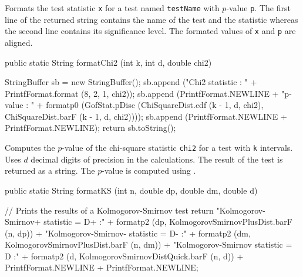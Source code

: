 \begin{tabb}   Formats the test statistic \texttt{x} for a test named \texttt{testName}
   with $p$-value \texttt{p}.  The first line of the returned string contains
   the name of the test and the statistic whereas the second line contains
   its significance level.  The formated values of \texttt{x} and \texttt{p} are
   aligned.
\end{tabb}
\begin{htmlonly}
\end{htmlonly}
\begin{code}

   public static String formatChi2 (int k, int d, double chi2)\begin{hide} {
      StringBuffer sb = new StringBuffer();
      sb.append ("Chi2 statistic                        : " +
                  PrintfFormat.format (8, 2, 1, chi2));
      sb.append (PrintfFormat.NEWLINE +
                 "p-value                               : " +
                 formatp0 (GofStat.pDisc
                          (ChiSquareDist.cdf (k - 1, d, chi2),
                           ChiSquareDist.barF (k - 1, d, chi2))));
      sb.append (PrintfFormat.NEWLINE + PrintfFormat.NEWLINE);
      return sb.toString();
   }\end{hide}
\end{code}
\begin{tabb}   Computes the $p$-value of the chi-square statistic
  \texttt{chi2} for a test with \texttt{k} intervals.  Uses $d$ decimal digits
  of precision in the calculations. The result of the
  test is returned as a string.  The $p$-value is computed using
  .
\end{tabb}
\begin{htmlonly}
\end{htmlonly}
\begin{code}

   public static String formatKS (int n, double dp,
                                  double dm, double d)\begin{hide} {
      // Prints the results of a Kolmogorov-Smirnov test
      return "Kolmogorov-Smirnov+ statistic = D+    :" +
             formatp2 (dp, KolmogorovSmirnovPlusDist.barF (n, dp)) +
             "Kolmogorov-Smirnov- statistic = D-    :" +
             formatp2 (dm, KolmogorovSmirnovPlusDist.barF (n, dm)) +
             "Kolmogorov-Smirnov statistic = D      :" +
             formatp2 (d, KolmogorovSmirnovDistQuick.barF (n, d)) +
                       PrintfFormat.NEWLINE + PrintfFormat.NEWLINE;
   }\end{hide}
\end{code}

